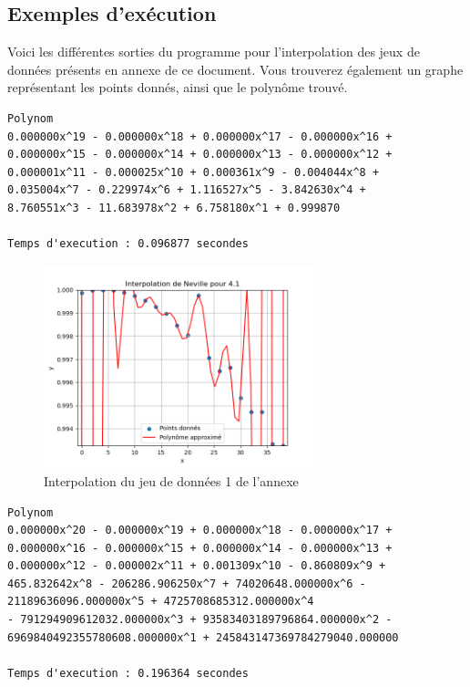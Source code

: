 \subsection{Exemples d'exécution}
Voici les différentes sorties du programme pour l'interpolation des jeux de données présents en annexe de ce document. Vous trouverez également un graphe représentant les points donnés, ainsi que le polynôme trouvé.
\begin{lstlisting}[caption={Annexe 1 data} results, basicstyle=\fontsize{8}{10}\selectfont]
    Polynom
0.000000x^19 - 0.000000x^18 + 0.000000x^17 - 0.000000x^16 + 
0.000000x^15 - 0.000000x^14 + 0.000000x^13 - 0.000000x^12 + 
0.000001x^11 - 0.000025x^10 + 0.000361x^9 - 0.004044x^8 + 
0.035004x^7 - 0.229974x^6 + 1.116527x^5 - 3.842630x^4 + 
8.760551x^3 - 11.683978x^2 + 6.758180x^1 + 0.999870

Temps d'execution : 0.096877 secondes
\end{lstlisting}
\begin{figure}[h]
    \centering
    \includegraphics[width=0.7\textwidth]{sources/Corentin/polynomApproch/results/graphs/41.png}
    \caption{Interpolation du jeu de données 1 de l'annexe}
\end{figure}
\newpage
\begin{lstlisting}[caption={Annexe 2 data} results, basicstyle=\fontsize{8}{10}\selectfont]
    Polynom
0.000000x^20 - 0.000000x^19 + 0.000000x^18 - 0.000000x^17 + 
0.000000x^16 - 0.000000x^15 + 0.000000x^14 - 0.000000x^13 + 
0.000000x^12 - 0.000002x^11 + 0.001309x^10 - 0.860809x^9 + 
465.832642x^8 - 206286.906250x^7 + 74020648.000000x^6 - 
21189636096.000000x^5 + 4725708685312.000000x^4 
- 791294909612032.000000x^3 + 93583403189796864.000000x^2 - 
6969840492355780608.000000x^1 + 245843147369784279040.000000

Temps d'execution : 0.196364 secondes
\end{lstlisting}
